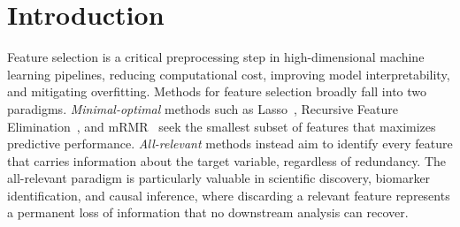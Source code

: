 \documentclass[runningheads]{llncs}
\newcommand{\writeme}[1]{\todo[inline,color=yellow!40]{WRITE: #1}}
\newcommand{\decision}[1]{\todo[inline,color=red!20]{DECISION: #1}}
\begin{document}



\section{Introduction}
\label{sec:introduction}

Feature selection is a critical preprocessing step in high-dimensional machine learning pipelines, reducing computational cost, improving model interpretability, and mitigating overfitting. Methods for feature selection broadly fall into two paradigms. \emph{Minimal-optimal} methods such as Lasso~\cite{tibshirani1996lasso}, Recursive Feature Elimination~\cite{guyon2002rfe}, and mRMR~\cite{peng2005mrmr} seek the smallest subset of features that maximizes predictive performance. \emph{All-relevant} methods instead aim to identify every feature that carries information about the target variable, regardless of redundancy. The all-relevant paradigm is particularly valuable in scientific discovery, biomarker identification, and causal inference, where discarding a relevant feature represents a permanent loss of information that no downstream analysis can recover.
\end{document}
